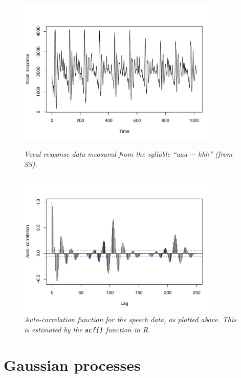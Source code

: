 \documentclass{article}
\begin{document}
\begin{figure}[p]
\centering
\includegraphics[width=0.875\textwidth]{fig/speech-1.pdf}
\caption{\it Vocal response data measured from the syllable ``aaa $\cdots$ hhh''
  (from SS).}  
\label{fig:covid}

\includegraphics[width=0.875\textwidth]{fig/speech-2.pdf}
\caption{\it Auto-correlation function for the speech data, as plotted
  above. This is estimated by the \texttt{acf()} function in R.}   
\label{fig:speech}
\end{figure}

\section{Gaussian processes}
\end{document}
